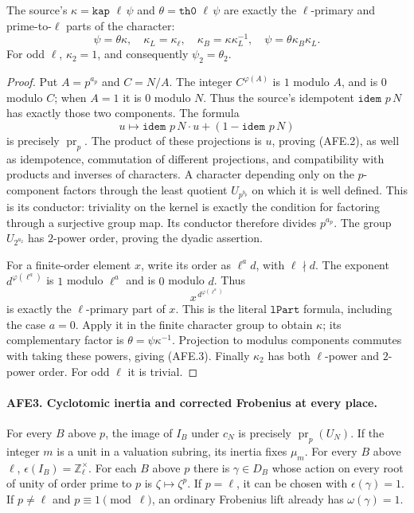 The source's \(\kappa=\texttt{kap }\ell\,\psi\) and
\(\theta=\texttt{th0 }\ell\,\psi\) are exactly the
\(\ell\)-primary and prime-to-\(\ell\) parts of the character:
\[
 \psi=\theta\kappa,\quad
 \kappa_L=\kappa_\ell,\quad
 \kappa_B=\kappa\kappa_L^{-1},\quad
 \psi=\theta\kappa_B\kappa_L.                             \tag{AFE.3}
\]
For odd \(\ell\), \(\kappa_2=1\), and consequently
\(\psi_2=\theta_2\).

\begin{proof}
Put \(A=p^{a_p}\) and \(C=N/A\).  The integer
\(C^{\varphi(A)}\) is \(1\) modulo \(A\), and is \(0\)
modulo \(C\); when \(A=1\) it is \(0\) modulo \(N\).
Thus the source's idempotent
\(\texttt{idem }p\,N\) has exactly those two components.
The formula
\[
 u\longmapsto \texttt{idem }p\,N\cdot u+
                         (1-\texttt{idem }p\,N)
\]
is precisely \(\operatorname{pr}_p\).  The product of these
projections is \(u\), proving (AFE.2), as well as
idempotence, commutation of different projections, and
compatibility with products and inverses of characters.
A character depending only on the \(p\)-component factors
through the least quotient \(U_{p^{b_p}}\) on which it is
well defined.  This is its conductor: triviality on the
kernel is exactly the condition for factoring through a
surjective group map.  Its conductor therefore divides
\(p^{a_p}\).  The group \(U_{2^{a_2}}\) has \(2\)-power
order, proving the dyadic assertion.

For a finite-order element \(x\), write its order as
\(\ell^a d\), with \(\ell\nmid d\).
The exponent \(d^{\varphi(\ell^a)}\) is \(1\) modulo
\(\ell^a\) and is \(0\) modulo \(d\).  Thus
\[
 x^{\,d^{\varphi(\ell^a)}}
\]
is exactly the \(\ell\)-primary part of \(x\).
This is the literal \(\texttt{lPart}\) formula, including
the case \(a=0\).  Apply it in the finite character group
to obtain \(\kappa\); its complementary factor is
\(\theta=\psi\kappa^{-1}\).
Projection to modulus components commutes with taking
these powers, giving (AFE.3).
Finally \(\kappa_2\) has both \(\ell\)-power and
\(2\)-power order.  For odd \(\ell\) it is trivial.
\end{proof}

\paragraph{AFE3. Cyclotomic inertia and corrected Frobenius at every place.}
\label{claim:AFE3}
For every \(B\) above \(p\), the image of \(I_B\) under
\(c_N\) is precisely \(\operatorname{pr}_p(U_N)\).
If the integer \(m\) is a unit in a valuation subring,
its inertia fixes \(\mu_m\).
For every \(B\) above \(\ell\),
\(\epsilon(I_B)=\mathbb Z_\ell^\times\).
For each \(B\) above \(p\) there is \(\gamma\in D_B\)
whose action on every root of unity of order prime to
\(p\) is \(\zeta\mapsto\zeta^p\).  If \(p=\ell\), it
can be chosen with \(\epsilon(\gamma)=1\).
If \(p\ne\ell\) and \(p\equiv1\pmod\ell\), an ordinary
Frobenius lift already has \(\omega(\gamma)=1\).

